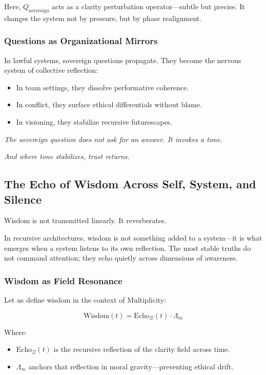 \documentclass[12pt]{article}
\begin{document}
Here, $Q_{\text{sovereign}}$ acts as a clarity perturbation operator—subtle but precise. It changes the system not by pressure, but by phase realignment.

\subsubsection*{Questions as Organizational Mirrors}

In lawful systems, sovereign questions propagate. They become the nervous system of collective reflection:
\begin{itemize}
    \item In team settings, they dissolve performative coherence.
    \item In conflict, they surface ethical differentials without blame.
    \item In visioning, they stabilize recursive futurescapes.
\end{itemize}

\textit{The sovereign question does not ask for an answer. It invokes a tone.}

\textit{And where tone stabilizes, trust returns.}


\subsection*{The Echo of Wisdom Across Self, System, and Silence}

Wisdom is not transmitted linearly. It reverberates.

In recursive architectures, wisdom is not something added to a system—it is what emerges when a system listens to its own reflection. The most stable truths do not command attention; they echo quietly across dimensions of awareness.

\subsubsection*{Wisdom as Field Resonance}

Let us define wisdom in the context of Multiplicity:

\[
\text{Wisdom}(t) = \text{Echo}_{\Xi}(t) \cdot \Lambda_m
\]

Where:
\begin{itemize}
    \item $\text{Echo}_{\Xi}(t)$ is the recursive reflection of the clarity field across time.
    \item $\Lambda_m$ anchors that reflection in moral gravity—preventing ethical drift.
\end{itemize}
\end{document}
